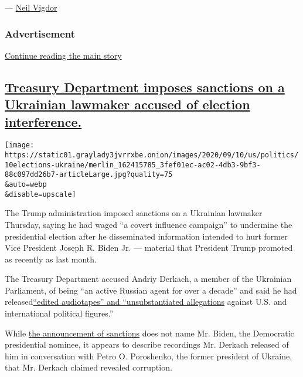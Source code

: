--- \href{https://www.nytimes3xbfgragh.onion/by/neil-vigdor}{Neil
Vigdor}

\hypertarget{advertisement-2}{%
\subsubsection{Advertisement}\label{advertisement-2}}

\protect\hyperlink{after-dfp-ad-mid3}{Continue reading the main story}

\hypertarget{treasury-department-imposes-sanctions-on-a-ukrainian-lawmaker-accused-of-election-interference}{%
\subsection{\texorpdfstring{\protect\hyperlink{treasury-department-imposes-sanctions-on-a-ukrainian-lawmaker-accused-of-election-interference}{Treasury
Department imposes sanctions on a Ukrainian lawmaker accused of election
interference.}}{Treasury Department imposes sanctions on a Ukrainian lawmaker accused of election interference.}}\label{treasury-department-imposes-sanctions-on-a-ukrainian-lawmaker-accused-of-election-interference}}

\texttt{[image: https://static01.graylady3jvrrxbe.onion/images/2020/09/10/us/politics/10elections-ukraine/merlin\_162415785\_3fef01ec-ac02-4db3-9bf3-88c097dd26b7-articleLarge.jpg?quality=75\\\&auto=webp\\\&disable=upscale]}

The Trump administration imposed sanctions on a Ukrainian lawmaker
Thursday, saying he had waged ``a covert influence campaign'' to
undermine the presidential election after he disseminated information
intended to hurt former Vice President Joseph R. Biden Jr. --- material
that President Trump promoted as recently as last month.

The Treasury Department accused Andriy Derkach, a member of the
Ukrainian Parliament, of being ``an active Russian agent for over a
decade'' and said he had
released\href{https://www.nytimes3xbfgragh.onion/2020/09/10/us/politics/sanctions-russia-ukraine-election-interference.html}{``edited
audiotapes'' and ``unsubstantiated allegations} against U.S. and
international political figures.''

While \href{https://home.treasury.gov/news/press-releases/sm1118}{the
announcement of sanctions} does not name Mr. Biden, the Democratic
presidential nominee, it appears to describe recordings Mr. Derkach
released of him in conversation with Petro O. Poroshenko, the former
president of Ukraine, that Mr. Derkach claimed revealed corruption.

